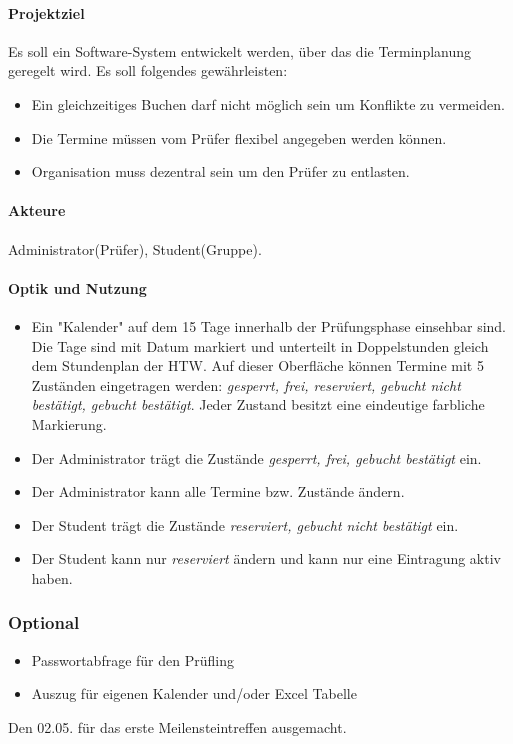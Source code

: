 \paragraph{Projektziel}
Es soll ein Software-System entwickelt werden, über das die Terminplanung geregelt wird. Es soll folgendes gewährleisten:
\begin{itemize}
\item Ein gleichzeitiges Buchen darf nicht möglich sein um Konflikte zu vermeiden.
\item Die Termine müssen vom Prüfer flexibel angegeben werden können.
\item Organisation muss dezentral sein um den Prüfer zu entlasten.
\end{itemize}

\paragraph{Akteure}
Administrator(Prüfer), Student(Gruppe).

\paragraph {Optik und Nutzung}
\begin{itemize}
\item Ein "Kalender" auf dem 15 Tage innerhalb der Prüfungsphase einsehbar sind. Die Tage sind mit Datum markiert und unterteilt in Doppelstunden gleich dem Stundenplan der HTW. Auf dieser Oberfläche können Termine mit 5 Zuständen eingetragen werden: \textit{gesperrt, frei, reserviert, gebucht nicht bestätigt, gebucht bestätigt}. Jeder Zustand besitzt eine eindeutige farbliche Markierung.
\item Der Administrator trägt die Zustände \textit{gesperrt, frei, gebucht bestätigt} ein.
\item Der Administrator kann alle Termine bzw. Zustände ändern.
\item Der Student trägt die Zustände \textit{reserviert, gebucht nicht bestätigt} ein.
\item Der Student kann nur \textit{reserviert} ändern und kann nur eine Eintragung aktiv haben.
\end{itemize}

\subsubsection{Optional}
\begin{itemize}
	\item Passwortabfrage für den Prüfling
	\item Auszug für eigenen Kalender und/oder Excel Tabelle
\end{itemize}
Den 02.05. für das erste Meilensteintreffen ausgemacht. 



